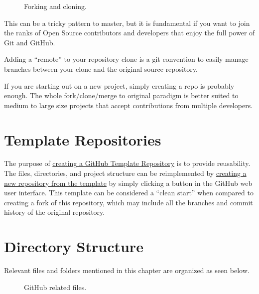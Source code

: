 \begin{figure}[!htb]
\centering

\caption{Forking and cloning.}
\label{forkandclone}
\end{figure}

\justifying
This can be a tricky pattern to master, but it is fundamental if you
want to join the ranks of Open Source contributors and developers that
enjoy the full power of Git and GitHub.

\justifying
Adding a ``remote'' to your repository clone is a git convention to easily manage branches between your clone and
the original source repository.

\justifying
If you are starting out on a new project, simply creating a repo is probably enough. The whole fork/clone/merge to original
paradigm is better suited to medium to large size projects that accept contributions from multiple developers.


\section{Template Repositories}

\justifying
The purpose of \href{https://docs.github.com/en/repositories/creating-and-managing-repositories/creating-a-template-repository}{creating a GitHub Template Repository} is to provide reusability. The files, directories, and project structure can be reimplemented
by \href{https://docs.github.com/en/repositories/creating-and-managing-repositories/creating-a-repository-from-a-template}{creating a new repository from the template} by simply clicking a button in the GitHub web user interface. This template can be
considered a ``clean start'' when compared to creating a fork of this repository, which may include all the branches and
commit history of the original repository.


\section{Directory Structure}

\justifying
Relevant files and folders mentioned in this chapter are organized as seen below.

\begin{figure}[!htb]
      \centering
      
      \caption{GitHub related files.}
      \label{githubfiles}
\end{figure}
